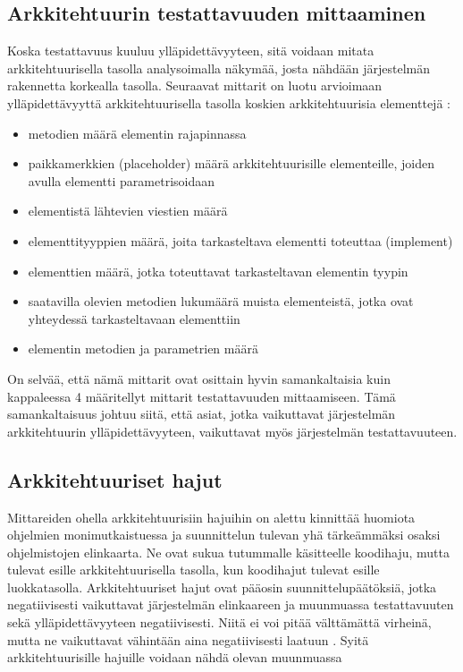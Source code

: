 \documentclass[finnish]{tktltiki2}
\theoremstyle{definition}
\theoremstyle{remark}
\begin{document}
\subsection{Arkkitehtuurin testattavuuden mittaaminen}

Koska testattavuus kuuluu ylläpidettävyyteen, sitä voidaan mitata arkkitehtuurisella tasolla analysoimalla näkymää, josta nähdään järjestelmän rakennetta korkealla tasolla. Seuraavat mittarit on luotu arvioimaan ylläpidettävyyttä arkkitehtuurisella tasolla koskien arkkitehtuurisia elementtejä \citep[s. 3-4]{bengtsson1998towards}:

\begin{itemize}
	\item metodien määrä elementin rajapinnassa
	\item paikkamerkkien (placeholder) määrä arkkitehtuurisille elementeille, joiden avulla elementti parametrisoidaan
	\item elementistä lähtevien viestien määrä
	\item elementtityyppien määrä, joita tarkasteltava elementti toteuttaa (implement)
	\item elementtien määrä, jotka toteuttavat tarkasteltavan elementin tyypin
	\item saatavilla olevien metodien lukumäärä muista elementeistä, jotka ovat yhteydessä tarkasteltavaan elementtiin
	\item elementin metodien ja parametrien määrä
\end{itemize}

On selvää, että nämä mittarit ovat osittain hyvin samankaltaisia kuin kappaleessa 4 määritellyt mittarit testattavuuden mittaamiseen. Tämä samankaltaisuus johtuu siitä, että asiat, jotka vaikuttavat järjestelmän arkkitehtuurin ylläpidettävyyteen, vaikuttavat myös järjestelmän testattavuuteen.

\subsection{Arkkitehtuuriset hajut}

Mittareiden ohella arkkitehtuurisiin hajuihin on alettu kinnittää huomiota ohjelmien monimutkaistuessa ja suunnittelun tulevan yhä tärkeämmäksi osaksi ohjelmistojen elinkaarta. Ne ovat sukua tutummalle käsitteelle koodihaju, mutta tulevat esille arkkitehtuurisella tasolla, kun koodihajut tulevat esille luokkatasolla. Arkkitehtuuriset hajut ovat pääosin suunnittelupäätöksiä, jotka negatiivisesti vaikuttavat järjestelmän elinkaareen ja muunmuassa testattavuuten sekä ylläpidettävyyteen negatiivisesti. Niitä ei voi pitää välttämättä virheinä, mutta ne vaikuttavat vähintään aina negatiivisesti laatuun \citep{de_andrade_architectural_2014}. Syitä arkkitehtuurisille hajuille voidaan nähdä olevan muunmuassa 
\end{document}
